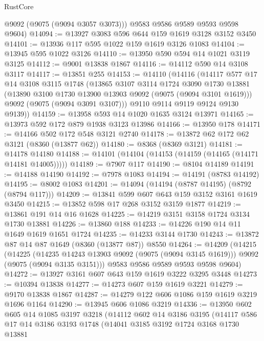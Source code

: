 \begin{lexlean}{RustCore}
\begin{coremodule}
        @9092
        (@9075 (@9094 @3057 @3073)))
      @9583
      @9586
      @9589
      @9593
      @9598
      @9604)
@14094 := @13927 @3083 @596 @644 @159 @1619 @3128 @3152 @3450
@14101 := @13936 @117 @595 @1022 @159 @1619 @3126 @1083
@14104 := @13945 @595 @1022 @3126
@14110 := @13950 @590 @594 @14 @1021 @3119 @3125
@14112 := @9001 @13838 @1867
@14116 := @14112 @590 @14 @3108 @3117
@14117 := @13851 @255
@14153 := @14110
    (@14116
      (@14117
        @577
        @17
        @14
        @3108
        @3115
        @1748
        (@13865
          @3107
          @3114
          @1724
          @3090
          @1730
          @13881
          (@13890 @3100 @1730 @13900 @13903 @9092 (@9075 (@9094 @3101 @1619)))
          @9092
          (@9075 (@9094 @3091 @3107)))
        @9110
        @9114
        @9119
        @9124
        @9130
        @9139))
@14159 := @13958 @593 @14 @1020 @1635 @3124 @13971
@14165 := @13973 @592 @172 @879 @1938 @3123 @13986
@14166 := @13950 @178
@14171 := @14166 @502 @172 @548 @3121 @2740
@14178 := @13872 @62 @172 @62 @3121 (@8360 (@13877 @62))
@14180 := @8368 (@8369 @3121)
@14181 := @14178 @14180
@14188 := @14101 (@14104 (@14153 (@14159 (@14165 (@14171 @14181 @14005)))))
@14189 := @7907 @117
@14190 := @8104 @14189
@14191 := @14188 @14190
@14192 := @7978 @1083
@14194 := @14191 (@8783 @14192)
@14195 := @8002 @1083
@14201 := @14094 (@14194 (@8787 @14195) (@8792 (@8794 @117)))
@14209 := @13841 @599 @607 @643 @159 @3152 @3161 @1619 @3450
@14215 := @13852 @598 @17 @268 @3152 @3159 @1877
@14219 := @13861 @191 @14 @16 @1628
@14225 := @14219 @3151 @3158 @1724 @3134 @1730 @13881
@14226 := @13860 @188
@14233 := @14226 @190 @14 @11 @1649 @1619 @1651 @1724
@14235 := @14233 @3144 @1730
@14243 := @13872 @87 @14 @87 @1649 (@8360 (@13877 @87)) @8550
@14264 := @14209
    (@14215
      (@14225
        (@14235 @14243 @13903 @9092 (@9075 (@9094 @3145 @1619)))
        @9092
        (@9075 (@9094 @3135 @3151)))
      @9583
      @9586
      @9589
      @9593
      @9598
      @9604)
@14272 := @13927 @3161 @607 @643 @159 @1619 @3222 @3295 @3448
@14273 := @10394 @13838
@14277 := @14273 @607 @159 @1619 @3221
@14279 := @9170 @13838 @1867
@14287 := @14279 @122 @606 @1086 @159 @1619 @3219 @1696 @1164
@14290 := @13945 @606 @1086 @3219
@14336 := @13950
    @602
    @605
    @14
    @1085
    @3197
    @3218
    (@14112
      @602
      @14
      @3186
      @3195
      (@14117
        @586
        @17
        @14
        @3186
        @3193
        @1748
        (@14041
          @3185
          @3192
          @1724
          @3168
          @1730
          @13881

\end{coremodule}
\end{lexlean}
